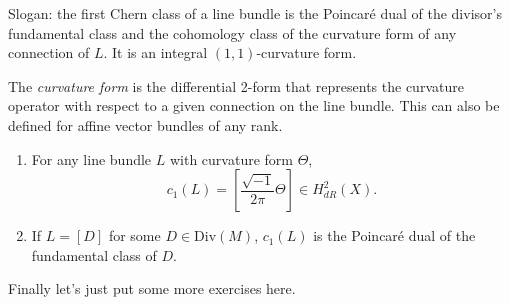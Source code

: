 \documentclass{book}
\begin{document}
Slogan: the first Chern class of a line
bundle
is the Poincaré dual of the divisor's
fundamental class
and the cohomology class of the curvature
form
of any connection of $L$.
It is an integral $(1,1)$-curvature form.

The {\it curvature form} is the differential
2-form
that represents the curvature operator with
respect to a given connection
on the line bundle.
This can also be defined for affine vector
bundles of any rank.

\begin{proposition}
\label{proposition-first-chern-class}
\begin{reference}
\cite[p. 141]{gri}
\end{reference}
\begin{enumerate}
\item For any line bundle $L$ with curvature
form $\Theta$,
$$
c_1(L)=\left[\frac{\sqrt{-1}}{2\pi}
\Theta\right]
\in H^2_{dR}(X).
$$

\item If $L=[D]$ for some $D \in
\text{Div}(M)$,
$c_1(L)$ is the Poincaré dual of the
fundamental class of $D$.
\end{enumerate}
\end{proposition}

\medskip\noindent
Finally let's just put some more exercises
here.
\end{document}
